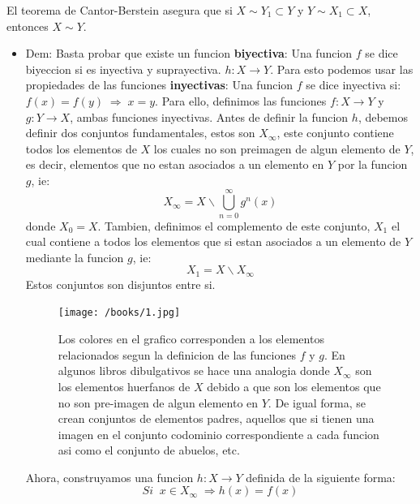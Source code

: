 El teorema de Cantor-Berstein asegura que si  $X \sim Y_1 \subset Y$ y  $Y \sim X_1 \subset X$, entonces  $X \sim Y$.
\begin{itemize}
\item Dem: Basta probar que existe un funcion     \textbf{biyectiva}: Una funcion  $f$ se dice biyeccion si es inyectiva y suprayectiva.     $h:X \to Y$. Para esto podemos usar las propiedades de las funciones     \textbf{inyectivas}: Una funcion  $f$ se dice inyectiva si:
$f(x)=f(y) \; \Rightarrow \; x=y$. Para ello, definimos las funciones  $f: X \to Y$ y  $g: Y \to X$, ambas funciones inyectivas.      Antes de definir la funcion  $h$, debemos definir dos conjuntos fundamentales, estos son  $X_\infty$, este conjunto contiene todos los elementos de  $X$ los cuales no son preimagen de algun elemento de  $Y$, es decir, elementos que no estan asociados a un elemento en  $Y$ por la funcion  $g$, ie:
$$
X_\infty = X \backslash \bigcup_{n=0}^\infty g^n(x)
$$
donde  $X_0 = X$. Tambien, definimos el complemento de este conjunto, $X_1$ el cual contiene a todos los elementos que si estan asociados a un elemento de  $Y$ mediante la funcion  $g$, ie:
$$
X_1 = X \backslash X_\infty
$$
Estos conjuntos son disjuntos entre si.       \begin{figure}[H]
\centering
\texttt{[image: /books/1.jpg]}
\caption{Los colores en el grafico corresponden a los elementos relacionados segun la definicion de las funciones  $f$ y $g$.
En algunos libros dibulgativos se hace una analogia donde  $X_\infty$ son los elementos huerfanos de  $X$ debido a que son los elementos que no son pre-imagen de algun elemento en  $Y$. De igual forma, se crean conjuntos de elementos padres, aquellos que si tienen una imagen en el conjunto codominio correspondiente a cada funcion asi como el conjunto de abuelos, etc.     }
\end{figure}
Ahora, construyamos una funcion  $h: X \to Y$ definida de la siguiente forma:
$$
Si\;\;x \in X_\infty\;\Rightarrow h(x)=f(x)
$$


\end{itemize}
